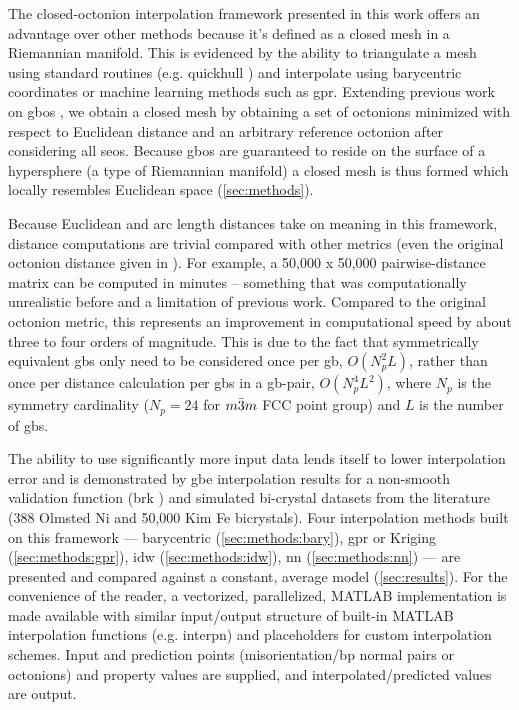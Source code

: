 \documentclass[preprint,12pt]{elsarticle}
\begin{document}
The closed-octonion interpolation framework presented in this work offers an advantage over other methods because it's defined as a closed mesh in a Riemannian manifold. This is evidenced by the ability to triangulate a mesh using standard routines (e.g. quickhull \cite{barberQuickhullAlgorithmConvex1996}) and interpolate using barycentric coordinates or machine learning methods such as \gls{gpr}. Extending previous work on \glspl{gbo} \cite{francisGeodesicOctonionMetric2019,chesserLearningGrainBoundary2020}, we obtain a closed mesh by obtaining a set of octonions minimized with respect to Euclidean distance and an arbitrary reference octonion after considering all \glspl{seo}. Because \glspl{gbo} are guaranteed to reside on the surface of a hypersphere \cite{francisGeodesicOctonionMetric2019} (a type of Riemannian manifold) a closed mesh is thus formed which locally resembles Euclidean space (\ref{sec:methods}).

Because Euclidean and arc length distances take on meaning in this framework, distance computations are trivial compared with other metrics (even the original octonion distance given in \cite{francisGeodesicOctonionMetric2019}). For example, a 50,000 x 50,000 pairwise-distance matrix can be computed in minutes -- something that was computationally unrealistic before and a limitation of previous work. Compared to the original octonion metric, this represents an improvement in computational speed by about three to four orders of magnitude. This is due to the fact that symmetrically equivalent \glspl{gb} only need to be considered once per \gls{gb}, $O(N_p^2L)$, rather than once per distance calculation per \glspl{gb} in a \gls{gb}-pair, $O(N_p^4L^2)$, where $N_p$ is the symmetry cardinality ($N_p=24$ for $m\Bar{3}m$ FCC point group) and $L$ is the number of \glspl{gb}. %

The ability to use significantly more input data lends itself to lower interpolation error and is demonstrated by \gls{gbe} interpolation results for a non-smooth validation function (\gls{brk} \cite{bulatovGrainBoundaryEnergy2014}) and simulated bi-crystal datasets from the literature (388 Olmsted Ni \cite{olmstedSurveyComputedGrain2009} and 50,000 Kim Fe \cite{kimIdentificationSchemeGrain2011} bicrystals). Four interpolation methods built on this framework --- barycentric (\ref{sec:methods:bary}), \gls{gpr} or Kriging (\ref{sec:methods:gpr}), \gls{idw} (\ref{sec:methods:idw}), \gls{nn} (\ref{sec:methods:nn}) --- are presented and compared against a constant, average model (\ref{sec:results}). For the convenience of the reader, a vectorized, parallelized, MATLAB implementation is made available \cite{bairdFiveDegreeofFreedom5DOF2020} with similar input/output structure of built-in MATLAB interpolation functions (e.g. interpn) and placeholders for custom interpolation schemes. Input and prediction points (misorientation/\gls{bp} normal pairs or octonions) and property values are supplied, and interpolated/predicted values are output.
\end{document}
